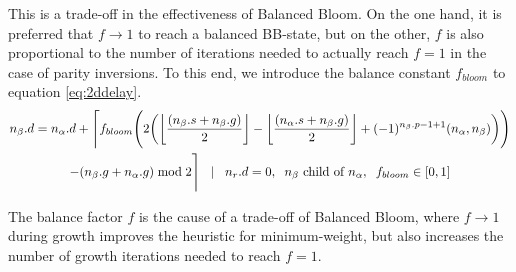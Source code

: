 This is a trade-off in the effectiveness of Balanced Bloom. On the one hand, it is preferred that $f\to1$ to reach a balanced BB-state, but on the other, $f$ is also proportional to the number of iterations needed to actually reach $f=1$ in the case of parity inversions. To this end, we introduce the balance constant $f_{bloom}$ to equation \eqref{eq:2ddelay}.
\begin{multline}\label{eq:delayequation}
  n_\beta.d = n_\alpha.d + \Bigg \lceil f_{bloom} \Bigg( 2\bigg({\left \lfloor \frac{(n_\beta.s+n_\beta.g)}{2} \right \rfloor } - {\left \lfloor \frac{(n_\alpha.s+n_\beta.g)}{2} \right \rfloor } + (-1)^{n_\beta.p-1+1}(n_\alpha,n_\beta)\bigg)
   \Bigg) \\ - (n_\beta.g + n_\alpha.g)\bmod 2 \Bigg \rceil \hspace{.3cm} | \hspace{.3cm} n_r.d = 0, \hspace{.2cm} n_\beta \mbox{ child of } n_\alpha, \hspace{.2cm} f_{bloom} \in [0, 1]
\end{multline}
\begin{lemma}\label{lem:tradeoff}
  The balance factor $f$ is the cause of a trade-off of Balanced Bloom, where $f\to1$ during growth improves the heuristic for minimum-weight, but also increases the number of growth iterations needed to reach $f=1$.
\end{lemma}

